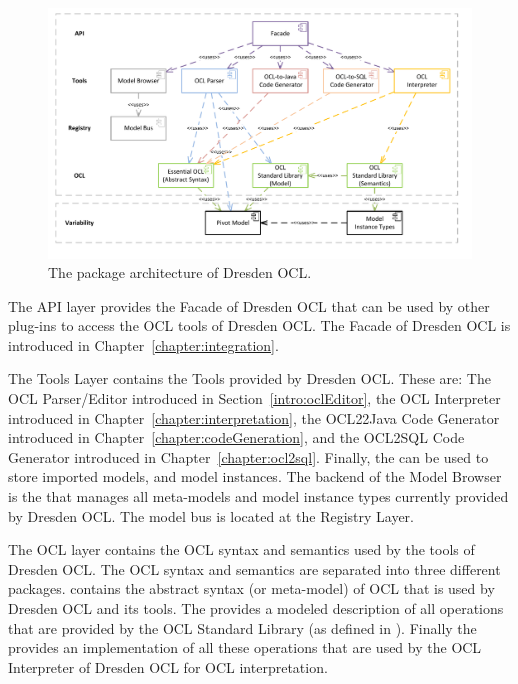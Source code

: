 \begin{figure}[!b]
	\centering
	\includegraphics[width=1.0\linewidth]{figures/architecture/modules}
	\caption{The package architecture of Dresden OCL.}
	\label{pic:architecture:modules}
\end{figure}

The API layer provides the Facade of Dresden OCL that can be used by other
plug-ins to access the \acs{OCL} tools of Dresden OCL. The Facade of Dresden OCL
is introduced in Chapter~\ref{chapter:integration}.

The Tools Layer contains the Tools provided by Dresden OCL. These are: The
\acs{OCL} Parser/Editor introduced in Section~\ref{intro:oclEditor}, the
\acs{OCL} Interpreter introduced in Chapter~\ref{chapter:interpretation}, the
\acs{OCL}22Java Code Generator introduced in
Chapter~\ref{chapter:codeGeneration}, and the
\acs{OCL}2SQL Code Generator introduced in
Chapter~\ref{chapter:ocl2sql}. Finally, the 
can be used to store imported models, and model instances. The backend of the Model
Browser is the  that manages all meta-models and model
instance types currently provided by Dresden OCL. The model bus is located at the
Registry Layer.

The \acs{OCL} layer contains the \acs{OCL} syntax and semantics used by the
tools of Dresden OCL. The \acs{OCL} syntax and semantics are separated into
three different packages.  contains the abstract syntax
(or meta-model) of \acs{OCL} that is used by Dresden OCL and its tools. The
 provides a modeled description of all
operations that are provided by the \acs{OCL} Standard Library (as defined in
\cite[Ch.~11]{spec:OCL2-2}). Finally the  provides an implementation of all these operations that are used by
the \acs{OCL} Interpreter of Dresden OCL for \acs{OCL} interpretation.

